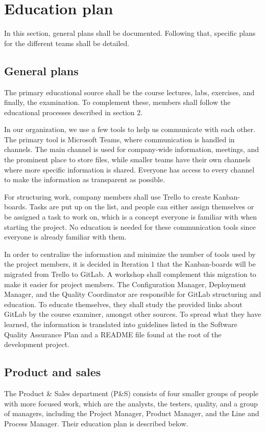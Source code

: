 \section{Education plan}
In this section, general plans shall be documented. Following that, specific plans for the different teams shall be detailed. 

\subsection{General plans}
The primary educational source shall be the course lectures, labs, exercises, and finally, the examination. To complement these, members shall follow the educational processes described in section 2. 

In our organization, we use a few tools to help us communicate with each other. The primary tool is Microsoft Teams, where communication is handled in channels. The main channel is used for company-wide information, meetings, and the prominent place to store files, while smaller teams have their own channels where more specific information is shared. Everyone has access to every channel to make the information as transparent as possible.

For structuring work, company members shall use Trello to create Kanban-boards. Tasks are put up on the list, and people can either assign themselves or be assigned a task to work on, which is a concept everyone is familiar with when starting the project. No education is needed for these communication tools since everyone is already familiar with them.

In order to centralize the information and minimize the number of tools used by the project members, it is decided in Iteration 1 that the Kanban-boards will be migrated from Trello to GitLab. A workshop shall complement this migration to make it easier for project members. The Configuration Manager, Deployment Manager, and the Quality Coordinator are responsible for GitLab structuring and education. To educate themselves, they shall study the provided links about GitLab by the course examiner, amongst other sources. To spread what they have learned, the information is translated into guidelines listed in the Software Quality Assurance Plan and a README file found at the root of the development project. 

\subsection{Product and sales}
The Product \& Sales department (P\&S) consists of four smaller groups of people with more focused work, which are the analysts, the testers, quality, and a group of managers, including the Project Manager, Product Manager, and the Line and Process Manager. Their education plan is described below.

